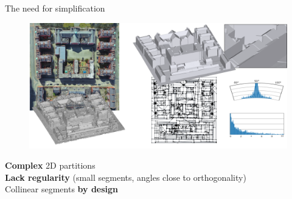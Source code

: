 %	
%		
%	

\begin{frame}{The need for simplification}
	\begin{figure}
		\includegraphics[width=\linewidth]{g862}
	\end{figure}
	
	\textbf{Complex} 2D partitions\\
	\textbf{Lack regularity} (small segments, angles close to orthogonality)\\
	Collinear segments \textbf{by design}\\
		
\end{frame}

